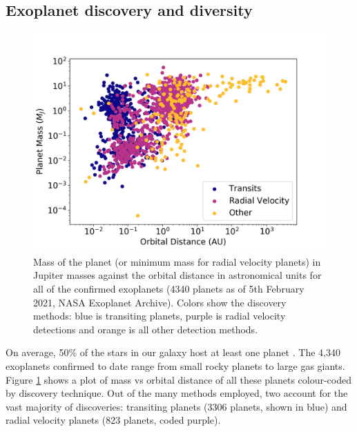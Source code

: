 \subsection{Exoplanet discovery and diversity} %

\begin{figure}
    \centering
    \includegraphics[width = \linewidth]{MA_NASAexo.png}
    \caption{Mass of the planet (or minimum mass for radial velocity planets) in Jupiter masses against the orbital distance in astronomical units for all of the confirmed exoplanets (4340 planets as of 5th February 2021, NASA Exoplanet Archive). Colors show the discovery methods: blue is transiting planets, purple is radial velocity detections and orange is all other detection methods.}
    \label{int:fig:ma}
\end{figure}


On average, 50\% of the stars in our galaxy host at least one planet \citep{Howard2012,Dressing2013,Batalha2013,Silburt2015}. The 4,340 exoplanets confirmed to date range from small rocky planets to large gas giants. Figure \ref{int:fig:ma} shows a plot of mass vs orbital distance of all these planets colour-coded by discovery technique. Out of the many methods employed, two account for the vast majority of discoveries: transiting planets (3306 planets, shown in blue) and radial velocity planets (823 planets, coded purple).


